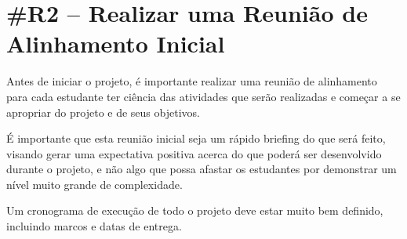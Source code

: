 \section*{\#R2 – Realizar uma Reunião de Alinhamento Inicial}

Antes de iniciar o projeto, é importante realizar uma reunião de alinhamento para cada estudante ter ciência das atividades que serão realizadas e começar a se apropriar do projeto e de seus objetivos.

É importante que esta reunião inicial seja um rápido briefing do que será feito, visando gerar uma expectativa positiva acerca do que poderá ser desenvolvido durante o projeto, e não algo que possa afastar os estudantes por demonstrar um nível muito grande de complexidade.

Um cronograma de execução de todo o projeto deve estar muito bem definido, incluindo marcos e datas de entrega.